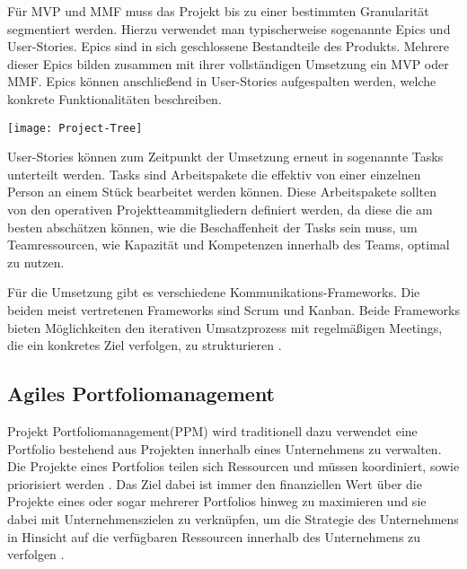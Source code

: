 Für MVP und MMF muss das Projekt bis zu einer bestimmten Granularität segmentiert werden. Hierzu verwendet man typischerweise sogenannte Epics und User-Stories. Epics sind in sich geschlossene Bestandteile des Produkts. Mehrere dieser Epics bilden zusammen mit ihrer vollständigen Umsetzung ein MVP oder MMF. Epics können anschließend in User-Stories aufgespalten werden, welche konkrete Funktionalitäten beschreiben. \cite{agilesProjektmanagementImBerufsalltagEpicsUndUserStories}

\vspace{20pt}
\begin{center}
    \begin{minipage}{0.8\linewidth}
        \texttt{[image: Project-Tree]}
    \end{minipage}
\end{center}
\vspace{20pt}

User-Stories können zum Zeitpunkt der Umsetzung erneut in sogenannte Tasks unterteilt werden. Tasks sind Arbeitspakete die effektiv von einer einzelnen Person an einem Stück bearbeitet werden können. Diese Arbeitspakete sollten von den operativen Projektteammitgliedern definiert werden, da diese die am besten abschätzen können, wie die Beschaffenheit der Tasks sein muss, um Teamressourcen, wie Kapazität und Kompetenzen innerhalb des Teams, optimal zu nutzen. \cite{agilesProjektmanagementImBerufsalltagEpicsUndUserStories}

Für die Umsetzung gibt es verschiedene Kommunikations-Frameworks. Die beiden meist vertretenen Frameworks sind Scrum und Kanban. Beide Frameworks bieten Möglichkeiten den iterativen Umsatzprozess mit regelmäßigen Meetings, die ein konkretes Ziel verfolgen, zu strukturieren \cite{}.

\subsection{Agiles Portfoliomanagement}
Projekt Portfoliomanagement(PPM) wird traditionell dazu verwendet eine Portfolio bestehend aus Projekten innerhalb eines Unternehmens zu verwalten. Die Projekte eines Portfolios teilen sich Ressourcen und müssen koordiniert, sowie priorisiert werden \cite{NGUYEN20181054}.
Das Ziel dabei ist immer den finanziellen Wert über die Projekte eines oder sogar mehrerer Portfolios hinweg zu maximieren und sie dabei mit Unternehmenszielen zu verknüpfen, um die Strategie des Unternehmens in Hinsicht auf die verfügbaren Ressourcen innerhalb des Unternehmens zu verfolgen \cite{MARTINSUO200756}.

